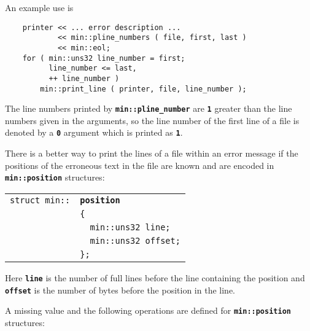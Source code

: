 \documentclass[12pt]{article}
\makeatletter
\newcommand{\TT}[1]{{\tt \bfseries #1}}
\newcommand{\ttindex}[1]{\index{#1@{\tt #1}}}
\newcommand{\ttmindex}[2]{\index{#1@{\tt #1}!#2}}
\newcommand{\EOL}{\penalty \exhyphenpenalty}
\newenvironment{indpar}[1][0.3in]%
	{\begin{list}{}%
		     {\setlength{\itemsep}{0in}%
		      \setlength{\topsep}{0in}%
		      \setlength{\parsep}{1ex}%
		      \setlength{\labelwidth}{#1}%
		      \setlength{\leftmargin}{#1}%
		      \addtolength{\leftmargin}{\labelsep}}%
	 \item}%
	{\end{list}}
\newcommand{\LABEL}[1]{\label{#1}}
\newlength{\ARGBREAKLENGTH}
\newcommand{\ARGBREAK}[1][\ARGBREAKLENGTH]{\\&\hspace*{#1}}
\newcommand{\MINKEY}[1]%
	   {\TT{#1}\ttindex{min::#1}\ttindex{#1}}
\makeatother
\begin{document}
An example use is

\begin{indpar}\begin{verbatim}
    printer << ... error description ...
            << min::pline_numbers ( file, first, last )
            << min::eol;
    for ( min::uns32 line_number = first;
          line_number <= last,
          ++ line_number )
        min::print_line ( printer, file, line_number );
\end{verbatim}\end{indpar}

The line numbers printed by \TT{min::\EOL pline\_\EOL number}
are \TT{1} greater than the line numbers given in the arguments,
so the line number of the first line of a file is denoted by a
\TT{0} argument which is printed as \TT{1}.

There is a better way to print the lines of a file within an
error message if the positions of the erroneous text in the file
are known and are encoded in
\TT{min::position} structures:

\begin{indpar}[1em]\begin{tabular}{r@{}l}
\verb|struct min::| & \MINKEY{position}\ARGBREAK
    \verb|{|\ARGBREAK
    \verb|  min::uns32 line;|\ARGBREAK
    \verb|  min::uns32 offset;|\ARGBREAK
    \verb|};|
\ttmindex{line}{in {\tt min::position}}
\ttmindex{offset}{in {\tt min::position}}
\ttmindex{column}{in {\tt min::position}}
\LABEL{MIN::POSITION_STRUCT} \\
\end{tabular}\end{indpar}

Here \TT{line} is the number of full lines before the line
containing the position and \TT{offset} is the
number of bytes before the position in the line.

A missing value and the following operations are defined
for \TT{min::\EOL position} structures:
\end{document}
